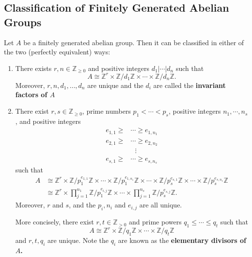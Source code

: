 \documentclass{article}
\begin{document}
\subsection{Classification of Finitely Generated Abelian Groups}
\begin{idea}
    Let $A$ be a finitely generated abelian group. Then it can be classified in either of the two (perfectly equivalent) ways:
    \begin{enumerate}
        \item There exists $r,n\in \mathbb{Z}_{\ge 0}$ and positive integers $d_1|\cdots |d_n$ such that
              \begin{equation}
                  A \cong \mathbb{Z}^r \times \mathbb{Z}/d_1\mathbb{Z} \times \cdots \times \mathbb{Z}/d_n\mathbb{Z}.
              \end{equation}
              Moreover, $r,n,d_1,\dots,d_n$ are unique and the $d_i$ are called the \textbf{invariant factors of $A$}
        \item There exist $r,s \in \mathbb{Z}_{\ge 0}$, prime numbers $p_1 < \cdots <p_s$, positive integers $n_1,\cdots, n_s$, and positive integers
              \begin{align*}
                  e_{1,1} \ge & \cdots \ge e_{1,n_1} \\
                  e_{2,1} \ge & \cdots \ge e_{2,n_2} \\
                              & \,\,\,\,\vdots       \\
                  e_{s,1} \ge & \cdots \ge e_{s,n_s}
              \end{align*}
              such that
              \begin{align*}
                  A & \cong \mathbb{Z}^r \times \mathbb{Z}/p_1^{e_{1,1}}\mathbb{Z} \times \cdots \times \mathbb{Z}/p_1^{e_{1,n_1}}\mathbb{Z} \times \cdots \times \mathbb{Z}/p_s^{e_{s,1}}\mathbb{Z} \times \cdots \times \mathbb{Z}/p_s^{e_{s,n_s}}\mathbb{Z} \\
                    & \cong \mathbb{Z}^r \times \prod_{j=1}^{n_1}\mathbb{Z}/p_1^{e_{i,j}}\mathbb{Z} \times \cdots \times \prod_{j=1}^{n_s}\mathbb{Z}/p_s^{e_{s,j}}\mathbb{Z}.
              \end{align*}
              Moreover, $r$ and $s$, and the $p_i,n_i$ and $e_{i,j}$ are all unique.
              \vspace{2mm}

              More concisely, there exist $r,t\in \mathbb{Z}_{>0}$ and prime powers $q_1\le \cdots \le q_t$ such that
              \begin{equation}
                  A \cong \mathbb{Z}^r \times \mathbb{Z}/q_1\mathbb{Z} \times \cdots \times \mathbb{Z}/q_t\mathbb{Z}
              \end{equation}
              and $r,t,q_i$ are unique. Note the $q_i$ are known as the \textbf{elementary divisors of $A$.}
    \end{enumerate}
\end{idea}
\end{document}
